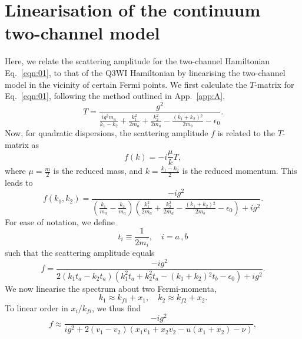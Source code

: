 \documentclass[aps,pra,
superscriptaddress,
reprint,twocolumn,preprintnumbers,
amsmath,amssymb,
nofootinbib]{revtex4-1}
\begin{document}

	\section{Linearisation of the continuum two-channel model}
	\label{app:B}
	
Here, we relate the scattering amplitude for the two-channel Hamiltonian Eq.~\eqref{eqn:01}, to that of the Q3WI Hamiltonian by linearising the two-channel model in the vicinity of certain Fermi points. We first calculate the $T$-matrix for Eq.~\eqref{eqn:01}, following the method outlined in App.~\ref{app:A},
		\begin{equation}
		T = \frac{g^2}{\frac{i g^2 m_a}{k_1 -k_2}+\frac{k_1^2}{2 m_a}+\frac{k_2^2}{2 m_a}-\frac{\left(k_1+k_2\right){}^2}{2 m_b}-\epsilon _0} .
		\end{equation}		
Now, for quadratic dispersions, the scattering amplitude $f$ is related to the $T$-matrix as
		\begin{equation}
		f(k) = - i \frac{\mu}{k} T ,
		\end{equation}
where $\mu = \frac{m}{2}$ is the reduced mass, and $k = \frac{k_1 - k_2}{2}$ is the reduced momentum. This leads to 
		\begin{equation}
		f(k_1,k_2) = \frac{-i g^2}{\left(\frac{k_1}{m_a}-\frac{k_2}{m_a}\right) \left(\frac{k_1^2}{2 m_a}+\frac{k_2^2}{2 m_a}-\frac{\left(k_1+k_2\right){}^2}{2 m_b}-\epsilon _0\right)+i g^2} .
		\end{equation}
For ease of notation, we define						
		\begin{equation}
		t_i \equiv \frac{1}{2 m_i} ,\quad i = a \,,b 
		\end{equation}				
such that the scattering amplitude equals
		\begin{equation}
		f = \frac{-i g^2}{2 \left(k_1 t_a-k_2 t_a\right) \left(k_1^2 t_a+k_2^2 t_a-\left(k_1+k_2\right){}^2 t_b-\epsilon _0\right)+i g^2}	 .
		\end{equation}
We now linearise the spectrum about two Fermi-momenta,
		\begin{equation}
		k_1 \approx k_{f1} + x_1 ,\quad k_2 \approx k_{f2} + x_2 .
		\end{equation}									
To linear order in $x_i/k_{fi}$, we thus find
		\begin{equation}
		 f \approx \frac{-i g^2}{i g^2 + 2 \left(v_1 - v_2\right) \left(x_1 v_1 + x_2 v_2 - u (x_1 + x_2) - \nu \right)} ,
		\end{equation}
\end{document}
